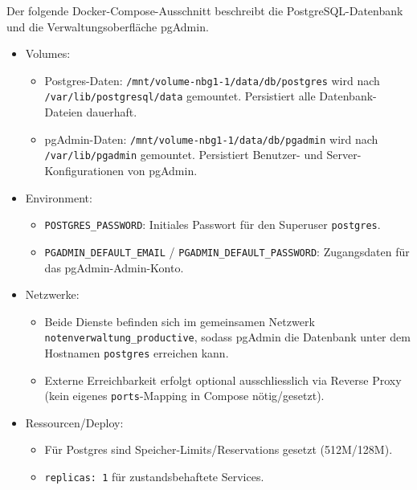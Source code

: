 \documentclass[11pt]{article}
\begin{document}
    Der folgende Docker-Compose-Ausschnitt beschreibt die PostgreSQL-Datenbank und die Verwaltungsoberfläche pgAdmin.
    \begin{itemize}
        \item Volumes:
        \begin{itemize}
            \item Postgres-Daten: \texttt{/mnt/volume-nbg1-1/data/db/postgres} wird nach \texttt{/var/lib/postgresql/data} gemountet.
            Persistiert alle Datenbank-Dateien dauerhaft.
            \item pgAdmin-Daten: \texttt{/mnt/volume-nbg1-1/data/db/pgadmin} wird nach \texttt{/var/lib/pgadmin} gemountet.
            Persistiert Benutzer- und Server-Konfigurationen von pgAdmin.
        \end{itemize}
        \item Environment:
        \begin{itemize}
            \item \texttt{POSTGRES\_PASSWORD}: Initiales Passwort für den Superuser \texttt{postgres}.
            \item \texttt{PGADMIN\_DEFAULT\_EMAIL} / \texttt{PGADMIN\_DEFAULT\_PASSWORD}: Zugangsdaten für das pgAdmin-Admin-Konto.
        \end{itemize}
        \item Netzwerke:
        \begin{itemize}
            \item Beide Dienste befinden sich im gemeinsamen Netzwerk \texttt{notenverwaltung\_productive}, sodass pgAdmin die Datenbank unter dem Hostnamen \texttt{postgres} erreichen kann.
            \item Externe Erreichbarkeit erfolgt optional ausschliesslich via Reverse Proxy (kein eigenes \texttt{ports}-Mapping in Compose nötig/gesetzt).
        \end{itemize}
        \item Ressourcen/Deploy:
        \begin{itemize}
            \item Für Postgres sind Speicher-Limits/Reservations gesetzt (512M/128M).
            \item \texttt{replicas: 1} für zustandsbehaftete Services.
        \end{itemize}
    \end{itemize}

    
\end{document}
